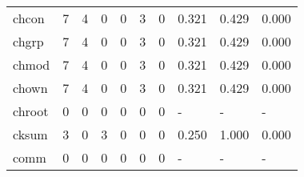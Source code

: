 \begin{longtable}{lp{1.3cm}p{1.3cm}p{1.3cm}p{1.3cm}p{1.3cm}p{1.3cm}p{1.3cm}p{1.3cm}p{1.3cm}}
chcon     &                      7 &                                  4 &                                 0 &                                0 &                                 3 &                               0 &                                0.321 &                                  0.429 &                                0.000 \\
chgrp     &                      7 &                                  4 &                                 0 &                                0 &                                 3 &                               0 &                                0.321 &                                  0.429 &                                0.000 \\
chmod     &                      7 &                                  4 &                                 0 &                                0 &                                 3 &                               0 &                                0.321 &                                  0.429 &                                0.000 \\
chown     &                      7 &                                  4 &                                 0 &                                0 &                                 3 &                               0 &                                0.321 &                                  0.429 &                                0.000 \\
chroot    &                      0 &                                  0 &                                 0 &                                0 &                                 0 &                               0 &                                    - &                                      - &                                    - \\
cksum     &                      3 &                                  0 &                                 3 &                                0 &                                 0 &                               0 &                                0.250 &                                  1.000 &                                0.000 \\
comm      &                      0 &                                  0 &                                 0 &                                0 &                                 0 &                               0 &                                    - &                                      - &                                    - \\

\end{longtable}

